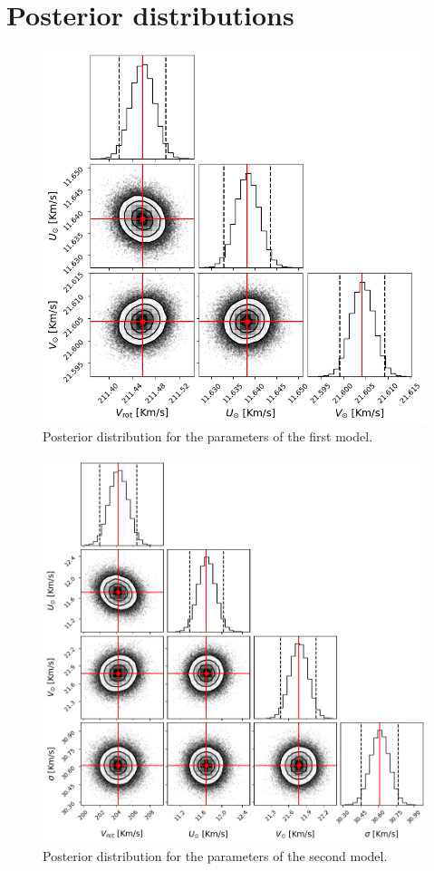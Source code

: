 \appendix

\section{Posterior distributions}

\begin{figure}[h]
    \centering
    \includegraphics[width = 0.8\linewidth]{Fig/PosteriorSimple.png}
    \caption{Posterior distribution for the parameters of the first model.}\label{fig:PosteriorSimple}
\end{figure}

\begin{figure}[h]
    \centering
    \includegraphics[width = 0.8\linewidth]{Fig/PosteriorFull.png}
    \caption{Posterior distribution for the parameters of the second model.}\label{fig:PosteriorFull}
\end{figure}